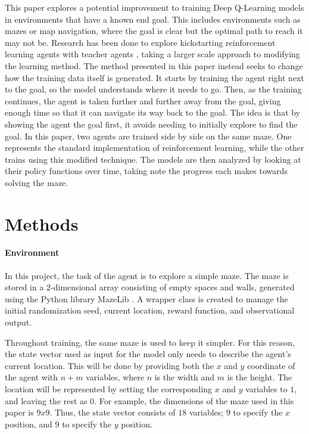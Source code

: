 \documentclass[12pt]{article}
\begin{document}
This paper explores a potential improvement to training Deep Q-Learning models in environments that have a known end goal.
This includes environments such as mazes or map navigation, where the goal is clear but the optimal path to reach it may not be.
Research has been done to explore kickstarting reinforcement learning agents with teacher agents \cite{article_kickstart_deep_reinforcement_learning}, taking a larger scale approach to modifying the learning method.
The method presented in this paper instead seeks to change how the training data itself is generated.
It starts by training the agent right next to the goal, so the model understands where it needs to go.
Then, as the training continues, the agent is taken further and further away from the goal, giving enough time so that it can navigate its way back to the goal.
The idea is that by showing the agent the goal first, it avoids needing to initially explore to find the goal.
In this paper, two agents are trained side by side on the same maze.
One represents the standard implementation of reinforcement learning, while the other trains using this modified technique.
The models are then analyzed by looking at their policy functions over time, taking note the progress each makes towards solving the maze.

\section{Methods}


\paragraph{Environment}

In this project, the task of the agent is to explore a simple maze.
The maze is stored in a 2-dimensional array consisting of empty spaces and walls, generated using the Python \cite{lang_python} library MazeLib \cite{lib_mazelib}.
A wrapper class is created to manage the initial randomization seed, current location, reward function, and observational output.

Throughout training, the same maze is used to keep it simpler.
For this reason, the state vector used as input for the model only needs to describe the agent's current location.
This will be done by providing both the $x$ and $y$ coordinate of the agent with $n + m$ variables, where $n$ is the width and $m$ is the height.
The location will be represented by setting the corresponding $x$ and $y$ variables to $1$, and leaving the rest as $0$.
For example, the dimensions of the maze used in this paper is $9x9$.
Thus, the state vector consists of $18$ variables; $9$ to specify the $x$ position, and $9$ to specify the $y$ position.
\end{document}
